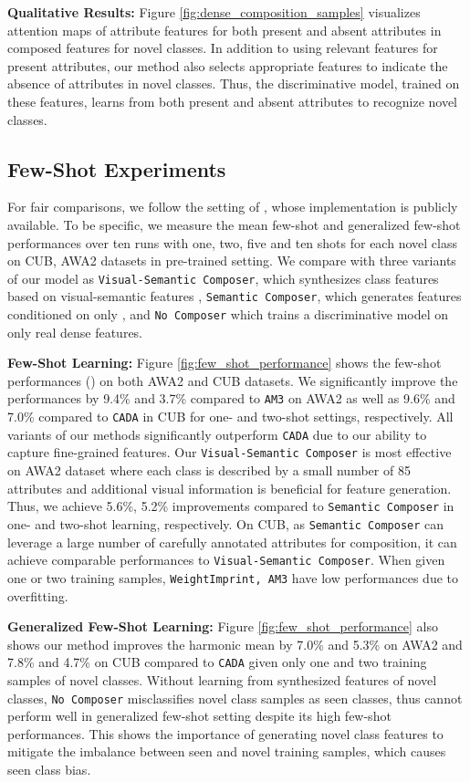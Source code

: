 \documentclass[10pt,journal,compsoc]{IEEEtran}
\newcommand{\1}{\boldsymbol{1}}
\newcommand{\0}{\boldsymbol{0}}
\newcommand{\<}{\langle}
\renewcommand{\>}{\rangle}
\newcommand{\myparagraph}[1]{\vspace{-2pt}\medskip\noindent\textbf{#1}}
\begin{document}
\myparagraph{Qualitative Results:}
Figure \ref{fig:dense_composition_samples} visualizes attention maps of attribute features for both present and absent attributes in composed features for novel classes.
In addition to using relevant features for present attributes, our method also selects appropriate features to indicate the absence of attributes in novel classes.
Thus, the discriminative model, trained on these features, learns from both present and absent attributes to recognize novel classes.




\subsection{Few-Shot Experiments}
For fair comparisons, we follow the setting of \cite{Schonfeld:CVPR19}, whose implementation is publicly available.
To be specific, we measure the mean few-shot and generalized few-shot performances over ten runs with one, two, five and ten shots for each novel class on CUB, AWA2 datasets in pre-trained setting.
We compare with three variants of our model as \texttt{Visual-Semantic Composer}, which synthesizes class features based on visual-semantic features , \texttt{Semantic Composer}, which generates features conditioned on only , and \texttt{No Composer} which trains a discriminative model on only real dense features.

\myparagraph{Few-Shot Learning:}
Figure \ref{fig:few_shot_performance} shows the few-shot performances () on both AWA2 and CUB datasets.
We significantly improve the performances by 9.4\% and 3.7\% compared to \texttt{AM3} on AWA2 as well as 9.6\% and 7.0\% compared to \texttt{CADA} in CUB for one- and two-shot settings, respectively.
All variants of our methods significantly outperform \texttt{CADA} due to our ability to capture fine-grained features.
Our \texttt{Visual-Semantic Composer} is most effective on AWA2 dataset where each class is described by a small number of 85 attributes and additional visual information is beneficial for feature generation. 
Thus, we achieve 5.6\%, 5.2\% improvements compared to \texttt{Semantic Composer} in one- and two-shot learning, respectively.
On CUB, as \texttt{Semantic Composer} can leverage a large number of carefully annotated attributes for composition, it can achieve comparable performances to \texttt{Visual-Semantic Composer}.
When given one or two training samples, \texttt{WeightImprint, AM3} have low performances due to overfitting.

\myparagraph{Generalized Few-Shot Learning:}
Figure \ref{fig:few_shot_performance} also shows our method improves the harmonic mean by 7.0\% and 5.3\% on AWA2 and 7.8\% and 4.7\% on CUB compared to \texttt{CADA} given only one and two training samples of novel classes.
Without learning from synthesized features of novel classes, \texttt{No Composer} misclassifies novel class samples as seen classes, thus cannot perform well in generalized few-shot setting despite its high few-shot performances.
This shows the importance of generating novel class features to mitigate the imbalance between seen and novel training samples, which causes seen class bias.
\end{document}
